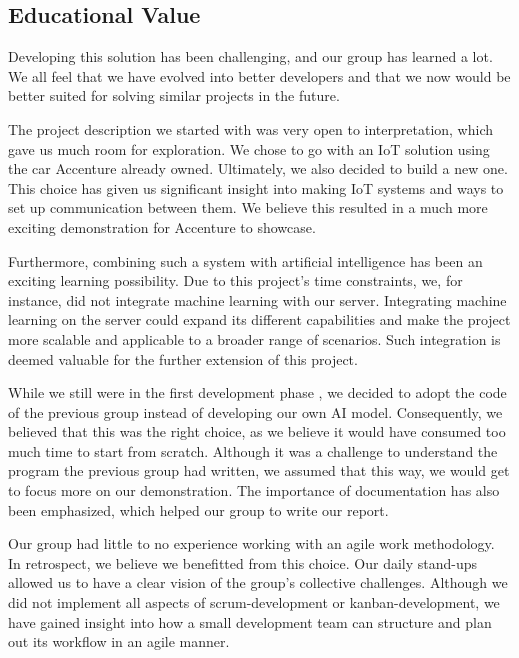 \subsection{Educational Value}
Developing this solution has been challenging, and our group has learned a lot. We all feel that we have evolved into better developers and that we now would be better suited for solving similar projects in the future. 

The project description we started with was very open to interpretation, which gave us much room for exploration. We chose to go with an IoT solution using the car Accenture already owned. Ultimately, we also decided to build a new one. This choice has given us significant insight into making IoT systems and ways to set up communication between them. We believe this resulted in a much more exciting demonstration for Accenture to showcase.

Furthermore, combining such a system with artificial intelligence has been an exciting learning possibility. Due to this project's time constraints, we, for instance, did not integrate machine learning with our server. Integrating machine learning on the server could expand its different capabilities and make the project more scalable and applicable to a broader range of scenarios. Such integration is deemed valuable for the further extension of this project.

While we still were in the first development phase , we decided to adopt the code of the previous group instead of developing our own AI model. Consequently, we believed that this was the right choice, as we believe it would have consumed too much time to start from scratch. Although it was a challenge to understand the program the previous group had written, we assumed that this way, we would get to focus more on our demonstration. The importance of documentation has also been emphasized, which helped our group to write our report. 

Our group had little to no experience working with an agile work methodology. In retrospect, we believe we benefitted from this choice. Our daily stand-ups allowed us to have a clear vision of the group's collective challenges. Although we did not implement all aspects of scrum-development or kanban-development, we have gained insight into how a small development team can structure and plan out its workflow in an agile manner.